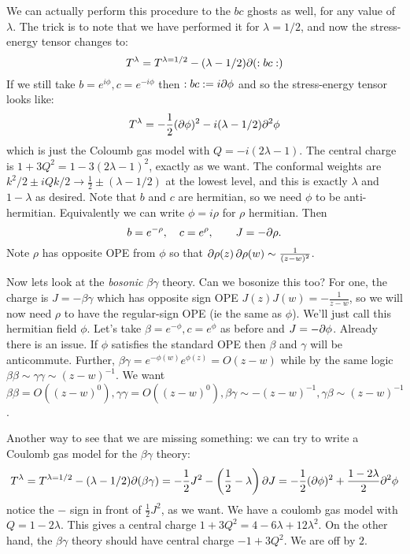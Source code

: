 \documentclass[11pt]{article}
\begin{document}
\begin{enumerate}
	We can actually perform this procedure to the $b c$ ghosts as well, for any value of $\lambda$. The trick is to note that we have performed it for $\lambda = 1/2$, and now the stress-energy tensor changes to:
	\[
		T^{\lambda} = T^{\lambda=1/2} - (\lambda-1/2) \partial(:b c:)
	\]
	If we still take $b = e^{i \phi}, c=e^{-i\phi}$ then $:b c: = i \partial \phi$ and so the stress-energy tensor looks like:
	\[
		T^\lambda = - \frac12 (\partial \phi)^2 - i (\lambda-1/2) \partial^2 \phi
	\]
	which is just the Coloumb gas model with $Q = - i (2 \lambda-1)$. The central charge is $1 + 3 Q^2 = 1 - 3 (2 \lambda-1)^2$, exactly as we want. The conformal weights are $k^2/2 \pm i Q k/2 \to \frac12 \pm (\lambda-1/2)$ at the lowest level, and this is exactly $\lambda$ and $1-\lambda$ as desired. Note that $b$ and $c$ are hermitian, so we need $\phi$ to be anti-hermitian. Equivalently we can write $\phi = i \rho$ for $\rho$ hermitian. Then
	\[
		b = e^{-\rho}, \quad c = e^{\rho}, \qquad J = - \partial \rho.
	\]
	Note $\rho$ has opposite OPE from $\phi$ so that $\partial \rho(z)\, \partial \rho(w) \sim \frac{1}{(z-w)^2}$.
	
	Now lets look at the \emph{bosonic} $\beta \gamma$ theory. Can we bosonize this too? For one, the charge is $J = - \beta \gamma$ which has opposite sign OPE $J(z) J(w) = -\frac{1}{z-w}$, so we will now need $\rho$ to have the regular-sign OPE (ie the same as $\phi$). We'll just call this hermitian field $\phi$. Let's take $\beta = e^{-\phi}, c = e^{\phi}$ as before and $J = - \partial \phi$. Already there is an issue. If $\phi$ satisfies the standard OPE then $\beta$ and $\gamma$ will be anticommute. Further, $\beta \gamma = e^{-\phi(w)} e^{\phi(z)} = O(z-w)$ while by the same logic $\beta \beta \sim \gamma \gamma \sim (z-w)^{-1}$. We want $\beta \beta = O((z-w)^0), \gamma \gamma = O((z-w)^0), \beta \gamma \sim -(z-w)^{-1}, \gamma \beta \sim (z-w)^{-1}$. 
	
	Another way to see that we are missing something: we can try to write a Coulomb gas model for the $\beta \gamma$ theory:
	\[
		T^\lambda = T^{\lambda = 1/2} - (\lambda-1/2) \partial (\beta \gamma) = - \frac{1}{2} J^2 - \left(\frac12 - \lambda\right) \partial J = - \frac12 (\partial \phi)^2 + \frac{1 - 2 \lambda}{2} \partial^2 \phi
	\]
	notice the $-$ sign in front of $\frac12 J^2$, as we want. We have a coulomb gas model with $Q = 1 -2 \lambda$. This gives a central charge $1 + 3Q^2 = 4 - 6 \lambda + 12 \lambda^2$. On the other hand, the $\beta \gamma$ theory should have central charge $-1 + 3Q^2$. We are off by $2$.
	

\end{enumerate}
\end{document}
